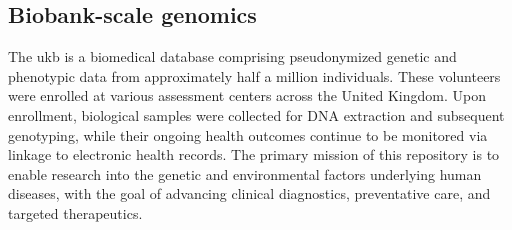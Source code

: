 \subsection{Biobank-scale genomics}

The \gls{ukb} \cite{Bycroft2018} is a biomedical database comprising pseudonymized genetic and phenotypic data from approximately half a million individuals. These volunteers were enrolled at various assessment centers across the United Kingdom. Upon enrollment, biological samples were collected for DNA extraction and subsequent genotyping, while their ongoing health outcomes continue to be monitored via linkage to electronic health records. The primary mission of this repository is to enable research into the genetic and environmental factors underlying human diseases, with the goal of advancing clinical diagnostics, preventative care, and targeted therapeutics.




